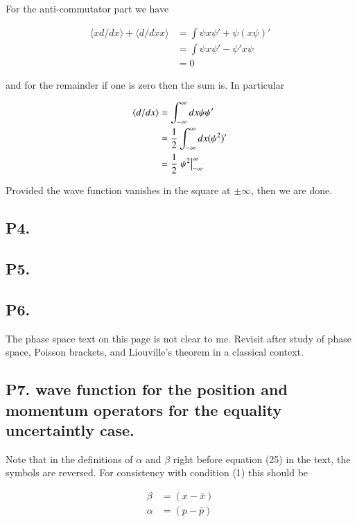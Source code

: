 \documentclass{article}
\newcommand{\expectation}[1]{\langle{#1}\rangle}
\begin{document}
For the anti-commutator part we have

\begin{align*}
\expectation{x d/dx} + \expectation{d/dx x} 
&=
\int \psi x \psi' + \psi (x \psi)' \\
&=
\int \psi x \psi' - \psi' x \psi \\
&= 0
\end{align*}

and for the remainder if one is zero then the sum is.  In particular

\begin{align*}
\expectation{d/dx} 
&= \int_{-\infty}^\infty dx \psi \psi' \\
&= \inv{2} \int_{-\infty}^\infty dx (\psi^2)' \\
&= \inv{2} \left. \psi^2 \right\vert_{-\infty}^\infty
\end{align*}

Provided the wave function vanishes in the square at $\pm \infty$, then we are done.

\subsection{ P4. }
\subsection{ P5. }
\subsection{ P6. }

The phase space text on this page is not clear to me.  Revisit after study
of phase space, Poisson brackets, and Liouville's theorem in a classical
context.

\subsection{ P7. wave function for the position and momentum operators for the equality uncertaintly case. }

Note that in the definitions of $\alpha$ and $\beta$ right before equation (25) in the text, the symbols are reversed.  For consistency with condition (1)
this should be

\begin{align*}
\beta &= (x - \bar{x}) \\
\alpha &= (p - \bar{p})
\end{align*}
\end{document}
